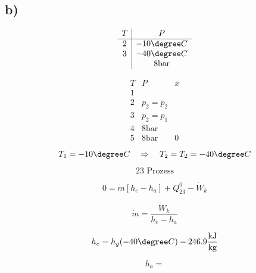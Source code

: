 

\subsection*{b)}

\[
\begin{array}{c|c}
T & P \\
\hline
2 & -10\degree C \\
3 & -40\degree C \\
 & 8 \text{bar}
\end{array}
\]

\[
\begin{array}{c|c|c}
T & P & x \\
\hline
1 & & \\
2 & p_2 = p_2 & \\
3 & p_2 = p_1 & \\
4 & 8 \text{bar} & \\
5 & 8 \text{bar} & 0
\end{array}
\]

\[
T_1 = -10\degree C \quad \Rightarrow \quad T_2 = T_2 = -40\degree C
\]

\[
23 \text{ Prozess}
\]

\[
0 = \dot{m} [h_e - h_a] + Q_{23}^0 - \dot{W}_k
\]

\[
\dot{m} = \frac{\dot{W}_k}{h_e - h_a}
\]

\[
h_e = h_g (-40\degree C) - 246.9 \frac{\text{kJ}}{\text{kg}}
\]

\[
h_a =
\]